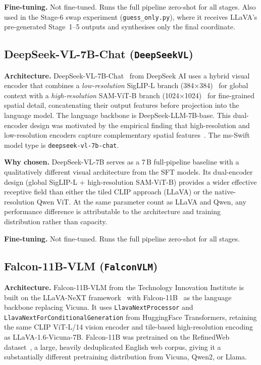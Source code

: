 \documentclass[11pt]{article}
\begin{document}
\textbf{Fine-tuning.} Not fine-tuned. Runs the full pipeline zero-shot for all stages.
Also used in the Stage-6 swap experiment (\texttt{guess\_only.py}), where it receives
LLaVA's pre-generated Stage~1--5 outputs and synthesises only the final coordinate.

\subsection{DeepSeek-VL-7B-Chat (\texttt{DeepSeekVL})}

\textbf{Architecture.} DeepSeek-VL-7B-Chat~\citep{Lu2024DeepSeekVL} from DeepSeek AI uses a
hybrid visual encoder that combines a \emph{low-resolution} SigLIP-L branch
(384$\times$384)~\citep{Zhai2023SigLIP} for global context with a \emph{high-resolution}
SAM-ViT-B branch (1024$\times$1024)~\citep{Kirillov2023SAM} for fine-grained spatial detail,
concatenating their output features before projection into the language model. The language
backbone is DeepSeek-LLM-7B-base. This dual-encoder design was motivated by the empirical
finding that high-resolution and low-resolution encoders capture complementary spatial
features~\citep{Lu2024DeepSeekVL}. The ms-Swift model type is \texttt{deepseek-vl-7b-chat}.

\textbf{Why chosen.} DeepSeek-VL-7B serves as a 7\,B full-pipeline baseline with a
qualitatively different visual architecture from the SFT models. Its dual-encoder design
(global SigLIP-L + high-resolution SAM-ViT-B) provides a wider effective receptive field
than either the tiled CLIP approach (LLaVA) or the native-resolution Qwen ViT. At the same
parameter count as LLaVA and Qwen, any performance difference is attributable to the
architecture and training distribution rather than capacity.

\textbf{Fine-tuning.} Not fine-tuned. Runs the full pipeline zero-shot for all stages.

\subsection{Falcon-11B-VLM (\texttt{FalconVLM})}

\textbf{Architecture.} Falcon-11B-VLM from the Technology Innovation Institute is built on
the LLaVA-NeXT framework~\citep{Liu2024LLaVANeXT} with Falcon-11B~\citep{Almazrouei2023Falcon}
as the language backbone replacing Vicuna. It uses \texttt{LlavaNextProcessor} and
\texttt{LlavaNextForConditionalGeneration} from HuggingFace Transformers, retaining the same
CLIP ViT-L/14 vision encoder and tile-based high-resolution encoding as LLaVA-1.6-Vicuna-7B.
Falcon-11B was pretrained on the RefinedWeb dataset~\citep{Almazrouei2023Falcon}, a large,
heavily deduplicated English web corpus, giving it a substantially different pretraining
distribution from Vicuna, Qwen2, or Llama.
\end{document}
